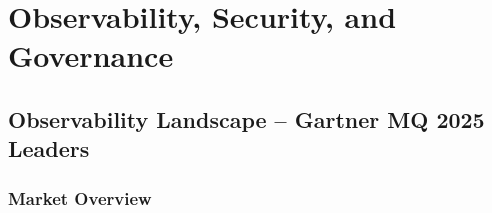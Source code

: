 
\chapter{Observability, Security, and Governance}
\label{chap:obs-sec-gov}

\begin{abstract}
  This chapter documents the observability, security, and governance stack
  that wraps the runtime (\cref{chap:runtime}) and agentic
  (\cref{chap:agentic}) substrates.  We survey the Gartner MQ~2025 observability
  leaders (\S\ref{sec:observability-landscape}), specify the OTEL SEMCONV
  extension for the $\Lambda$-axis (\S\ref{sec:otel-semconv}), characterise
  the cybersecurity stack (\S\ref{sec:cybersecurity}), analyse the IQT
  sovereign-AI on-ramp (\S\ref{sec:iqt-sovereign}), document AIMS@COLM~2026
  AI measurement science (\S\ref{sec:aims}), map the NIST AI RMF to the
  $\Lambda$-axis (\S\ref{sec:nist-rmf}), integrate the UK AISI Inspect
  harness (\S\ref{sec:aisi-inspect}), analyse OpenMDW-1.1 model-centric
  licensing (\S\ref{sec:openmdw}), and describe dataset provenance via
  Daniel van Strien's HuggingFace lineage explorer (\S\ref{sec:dataset-provenance}).
  A Frontier Capability section (\S\ref{sec:obs-sec-frontier}) closes the
  chapter with the impossibility--possibility argument for each major system.
\end{abstract}

\section{Observability Landscape -- Gartner MQ 2025 Leaders}
\label{sec:observability-landscape}

\subsection{Market Overview}
\label{ssec:obs-market}

